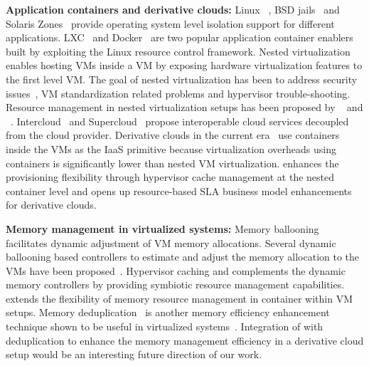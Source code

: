 \noindent
{\bf Application containers and derivative clouds:} Linux \cgroups~\cite{cgroup},
BSD jails~\cite{jail} and Solaris Zones~\cite{zone} provide operating system 
level isolation support for different applications.
%  
LXC~\cite{lxc} and Docker~\cite{docker} are two popular application container
enablers built by exploiting the Linux \cgroup{} resource control framework.
%
Nested virtualization~\cite{turtle,blanket,recursv} enables hosting VMs inside a VM
by exposing hardware virtualization features to the first level VM.
%
The goal of nested virtualization has been to address security issues~\cite{vx32},
VM standardization related problems and hypervisor trouble-shooting. 
%
Resource management in nested virtualization setups has been proposed 
by ~\cite{intercloud} and ~\cite{supercloud}.
%
Intercloud~\cite{intercloud} and Supercloud~\cite{supercloud} propose 
interoperable 
cloud services 
decoupled from the cloud provider. 
%
Derivative clouds in the current era~\cite{spotcheck, heroku, picloud} use 
containers inside the VMs as the IaaS primitive because virtualization 
overheads using containers is significantly lower than 
nested VM virtualization.
%
\dd{} enhances the provisioning flexibility through hypervisor cache management
at the nested container level and opens up resource-based SLA
business model enhancements for 
derivative clouds.


\noindent
{\bf Memory management in virtualized systems:} Memory 
ballooning~\cite{vmware,hotplug} facilitates dynamic adjustment of VM memory  
allocations.
%
Several dynamic ballooning based controllers to estimate and adjust the memory 
allocation to the VMs have been proposed~\cite{wss, membal, tws}.
%
Hypervisor caching and \dd{} complements the dynamic memory controllers
by providing symbiotic resource management capabilities.
%
\dd{} extends the flexibility of memory resource management in container 
within VM setups.
%
Memory deduplication~\cite{vmware,ksmpaper,satori} is another memory
efficiency enhancement technique shown to be useful in virtualized
systems~\cite{ksmpaper,utc}.   
%
Integration of \dd{} with deduplication to enhance the memory management
efficiency in a derivative cloud setup would be an interesting future
direction of our work.
%
%

